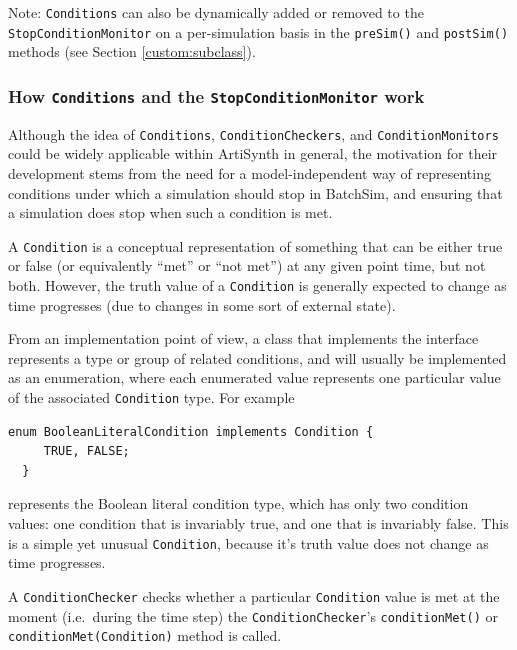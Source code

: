 \documentclass{article}
\begin{document}
\begin{sideblock}
Note: {\tt Conditions} can also be dynamically added or removed to the {\tt StopConditionMonitor} on a per-simulation basis in the {\tt preSim()} and {\tt postSim()} methods (see Section \ref{custom:subclass}).
\end{sideblock}

\subsubsection{How {\tt Conditions} and the {\tt StopConditionMonitor} work}

Although the idea of {\tt Conditions}, {\tt ConditionCheckers}, and {\tt ConditionMonitors} could be widely applicable within ArtiSynth in general, the motivation for their development stems from the need for a model-independent way of representing conditions under which a simulation should stop in BatchSim, and ensuring that a simulation does stop when such a condition is met.

A {\tt Condition} is a conceptual representation of something that can be either true or false (or equivalently ``met'' or ``not met'') at any given point time, but not both. However, the truth value of a {\tt Condition} is generally expected to change as time progresses (due to changes in some sort of external state).

From an implementation point of view, a class that implements the  interface represents a type or group of related conditions, and will usually be implemented as an enumeration, where each enumerated value represents one particular value of the associated {\tt Condition} type. For example

\begin{lstlisting}[]
  enum BooleanLiteralCondition implements Condition {
     TRUE, FALSE;
  }
\end{lstlisting}

represents the Boolean literal condition type, which has only two condition values: one condition that is invariably true, and one that is invariably false. This is a simple yet unusual {\tt Condition}, because it's truth value does not change as time progresses.

A {\tt ConditionChecker} checks whether a particular {\tt Condition} value is met at the moment (i.e.\ during the time step) the {\tt ConditionChecker}'s {\tt conditionMet()} or {\tt conditionMet(Condition)} method is called.
\end{document}
